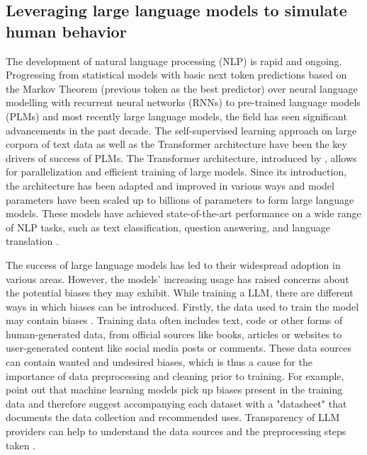 \subsection{Leveraging large language models to simulate human behavior}
\par The development of natural language processing (NLP) is rapid and ongoing. Progressing from statistical models with basic next token predictions based on the Markov Theorem (previous token as the best predictor) over neural language modelling with recurrent neural networks (RNNs) to pre-trained language models (PLMs) and most recently large language models, the field has seen significant advancements in the past decade. The self-supervised learning approach on large corpora of text data as well as the Transformer architecture have been the key drivers of success of PLMs. The Transformer architecture, introduced by \textcite{vaswani2017attention}, allows for parallelization and efficient training of large models. Since its introduction, the architecture has been adapted and improved in various ways and model parameters have been scaled up to billions of parameters to form large language models. These models have achieved state-of-the-art performance on a wide range of NLP tasks, such as text classification, question answering, and language translation \parencite{naveed2023comprehensive, zhao2023survey}.

\par The success of large language models has led to their widespread adoption in various areas. However, the models' increasing usage has raised concerns about the potential biases they may exhibit. While training a LLM, there are different ways in which biases can be introduced. Firstly, the data used to train the model may contain biases \parencite{bender2021dangers, naveed2023comprehensive, zhao2023survey}. Training data often includes text, code or other forms of human-generated data, from official sources like books, articles or websites to user-generated content like social media posts or comments. These data sources can contain wanted and undesired biases, which is thus a cause for the importance of data preprocessing and cleaning prior to training. For example, \textcite{gebru2021datasheets} point out that machine learning models pick up biases present in the training data and therefore suggest accompanying each dataset with a "datasheet" that documents the data collection and recommended uses. Transparency of LLM providers can help to understand the data sources and the preprocessing steps taken \parencite{naveed2023comprehensive, zhao2023survey}.

